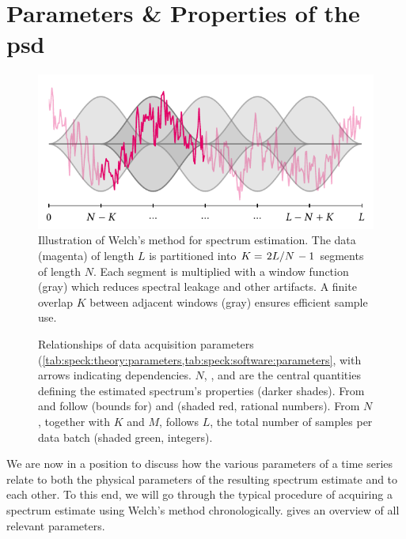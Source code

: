 \section{Parameters \& Properties of the \texorpdfstring{\acrshort{psd}}{PSD}}\label{sec:speck:theory:welch:parameters}
\begin{figure}
    \centering
    \includegraphics[width=\textwidth]{img/pdf/spectrometer/welch}
    \caption[]{
        Illustration of Welch's method for spectrum estimation.
        The data (magenta) of length $L$ is partitioned into $K = \flatfrac{2L}{N} - 1$ segments of length $N$.
        Each segment is multiplied with a window function (gray) which reduces spectral leakage and other artifacts.
        A finite overlap $K$ between adjacent windows (gray) ensures efficient sample use.
    }
    \label{fig:speck:welch}
\end{figure}
\begin{figure}
    \centering
    
    \caption[]{
        Relationships of data acquisition parameters (\cf \cref{tab:speck:theory:parameters,tab:speck:software:parameters}, with arrows indicating dependencies.
        $N$, \fs, and \df are the central quantities defining the estimated spectrum's properties (darker shades).
        From \fs and \df follow (bounds for) \fmax and \fmin (shaded red, rational numbers).
        From $N$, together with $K$ and $M$, follows $L$, the total number of samples per data batch (shaded green, integers).
    }
    \label{fig:speck:theory:parameters}
\end{figure}

We are now in a position to discuss how the various parameters of a time series relate to both the physical parameters of the resulting spectrum estimate and to each other.
To this end, we will go through the typical procedure of acquiring a spectrum estimate using Welch's method chronologically.
 gives an overview of all relevant parameters.

